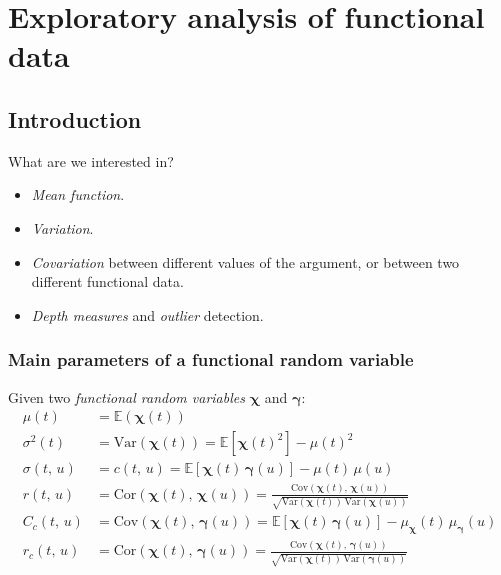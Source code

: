 \chapter{Exploratory analysis of functional data}

\section{Introduction}
\begin{question}{What are we interested in?}{}
	\begin{itemize}
		\item \emph{Mean function}.
		\item \emph{Variation}.
		\item \emph{Covariation} between different values of the argument,
		      or between two different functional data.
		\item \emph{Depth measures} and \emph{outlier} detection.
	\end{itemize}
\end{question}

\subsection{Main parameters of a functional random variable}

\newcommand{\X}{{\boldsymbol{\chi}}}
\newcommand{\Y}{{\boldsymbol{\gamma}}}
Given two \emph{functional random variables} $\X$ and $\Y$:
\begin{align*}
	\mu(t)        & = \mathds E(\X(t)) \tag{Mean function}                                                                                                       \\
	\sigma^2(t)   & = \text{Var}(\X(t)) = \mathds E\left[
		\X(t)^2
	\right] - \mu(t)^2 \tag{Variance function}                                                                                                                   \\
	\sigma(t,\,u) & = c(t,\,u) = \mathds E\left[
		\X(t)\,\Y(u)
	\right] - \mu(t)\,\mu(u) \tag{Covariance function}                                                                                                           \\
	r(t,\,u)      & = \text{Cor}(\X(t),\,\X(u)) =
	\frac{\text{Cov}(\X(t),\,\X(u))}{\sqrt{\text{Var}(\X(t))\,\text{Var}(\X(u))}}
	\tag{Correlation function}                                                                                                                                   \\
	C_c(t,\,u)    & = \text{Cov}(\X(t),\,\Y(u)) = \mathds E\left[ \X(t)\,\Y(u) \right] - \mu_\X(t)\,\mu_\Y(u) \tag{Cross-covariance function}                    \\
	r_c(t,\,u)    & = \text{Cor}(\X(t),\,\Y(u)) = \frac{\text{Cov}(\X(t),\,\Y(u))}{\sqrt{\text{Var}(\X(t))\,\text{Var}(\Y(u))}} \tag{Cross-correlation function}
\end{align*}

